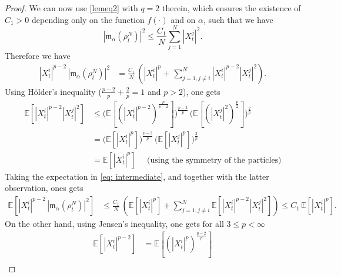 \documentclass[12pt]{amsart}
\numberwithin{equation}{section}
\begin{document}
\begin{proof}
We can now use \eqref{lemeq2} with $q=2$ therein, which ensures the existence of $C_{1}>0$ depending only on the function $f(\cdot)$ and on $\alpha$, such that we have
\begin{equation*}
    |\mathfrak{m}_{\alpha}(\rho^{N}_{t})|^{2} \leq \frac{C_{1}}{N}\sum\limits_{j=1}^{N}|X^{j}_{t}|^{2}.
\end{equation*}
Therefore we have
\begin{equation}\label{eq: intermediate}
    \begin{aligned}
        |X^{i}_{t}|^{p-2} \,|\mathfrak{m}_{\alpha}(\rho^{N}_{t})|^{2} 
        & =  \frac{C_{1}}{N} \, \left(|X^{i}_{t}|^{p}+ \, \sum\limits_{j=1,j\neq i}^{N}|X^{i}_{t}|^{p-2}|X^{j}_{t}|^{2} \right).
    \end{aligned}
\end{equation}
Using H\"older's inequality ($\frac{p-2}{p} + \frac{2}{p} =1$ and $p>2$), one gets
\begin{equation*}
    \begin{aligned}
        \mathbb{E}\left[|X^{i}_{t}|^{p-2}|X^{j}_{t}|^{2}\right] & \leq \bigg(\mathbb{E}\left[(|X^{i}_{t}|^{p-2})^{\frac{p}{p-2}}\right]\bigg)^{\frac{p-2}{p}}\, \bigg(\mathbb{E}\left[(|X^{j}_{t}|^{2})^{\frac{p}{2}}\right]\bigg)^{\frac{2}{p}}\\
        & = \bigg(\mathbb{E}\left[|X^{i}_{t}|^{p}\right]\bigg)^{\frac{p-2}{p}}\, \bigg(\mathbb{E}\left[|X^{j}_{t}|^{p}\right]\bigg)^{\frac{2}{p}}\\
        & = \mathbb{E}\left[|X^{i}_{t}|^{p}\right] \quad \text{ (using the symmetry of the particles)}
    \end{aligned}
\end{equation*}
Taking the expectation in \eqref{eq: intermediate}, and together with the latter observation, ones gets
\begin{equation*}
    \begin{aligned}
        \mathbb{E}\left[|X^{i}_{t}|^{p-2} \,|\mathfrak{m}_{\alpha}(\rho^{N}_{t})|^{2}\right] 
        & \leq \frac{C_{1}}{N} \, \left(\mathbb{E}\left[|X^{i}_{t}|^{p}\right] + \sum\limits_{j=1,j\neq i}^{N} \mathbb{E}\left[|X^{i}_{t}|^{p-2}|X^{j}_{t}|^{2}\right] \right)  \leq C_{1}\, \mathbb{E}\left[|X^{i}_{t}|^{p}\right]. 
    \end{aligned}
\end{equation*}
On the other hand, using  Jensen's inequality, one gets for all $ 3\leq p<\infty $
\begin{align*}
    \mathbb{E}[|X^{i}_{t}|^{p-2}] & = \mathbb{E}\left[(|X^{i}_{t}|^{p})^{\frac{p-2}{p}}\right] \\

\end{align*}
\end{proof}
\end{document}
